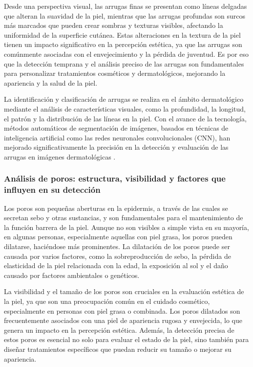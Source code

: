 Desde una perspectiva visual, las arrugas finas se presentan como líneas delgadas que alteran la suavidad de la piel, mientras que las arrugas profundas son surcos más marcados que pueden crear sombras y texturas visibles, afectando la uniformidad de la superficie cutánea. Estas alteraciones en la textura de la piel tienen un impacto significativo en la percepción estética, ya que las arrugas son comúnmente asociadas con el envejecimiento y la pérdida de juventud. Es por eso que la detección temprana y el análisis preciso de las arrugas son fundamentales para personalizar tratamientos cosméticos y dermatológicos, mejorando la apariencia y la salud de la piel.

La identificación y clasificación de arrugas se realiza en el ámbito dermatológico mediante el análisis de características visuales, como la profundidad, la longitud, el patrón y la distribución de las líneas en la piel. Con el avance de la tecnología, métodos automáticos de segmentación de imágenes, basados en técnicas de inteligencia artificial como las redes neuronales convolucionales (CNN), han mejorado significativamente la precisión en la detección y evaluación de las arrugas en imágenes dermatológicas \parencite{farage2013}.

\subsubsection{Análisis de poros: estructura, visibilidad y factores que influyen en su detección}
Los poros son pequeñas aberturas en la epidermis, a través de las cuales se secretan sebo y otras sustancias, y son fundamentales para el mantenimiento de la función barrera de la piel. Aunque no son visibles a simple vista en su mayoría, en algunas personas, especialmente aquellas con piel grasa, los poros pueden dilatarse, haciéndose más prominentes. La dilatación de los poros puede ser causada por varios factores, como la sobreproducción de sebo, la pérdida de elasticidad de la piel relacionada con la edad, la exposición al sol y el daño causado por factores ambientales o genéticos.

La visibilidad y el tamaño de los poros son cruciales en la evaluación estética de la piel, ya que son una preocupación común en el cuidado cosmético, especialmente en personas con piel grasa o combinada. Los poros dilatados son frecuentemente asociados con una piel de apariencia rugosa y envejecida, lo que genera un impacto en la percepción estética. Además, la detección precisa de estos poros es esencial no solo para evaluar el estado de la piel, sino también para diseñar tratamientos específicos que puedan reducir su tamaño o mejorar su apariencia. 

